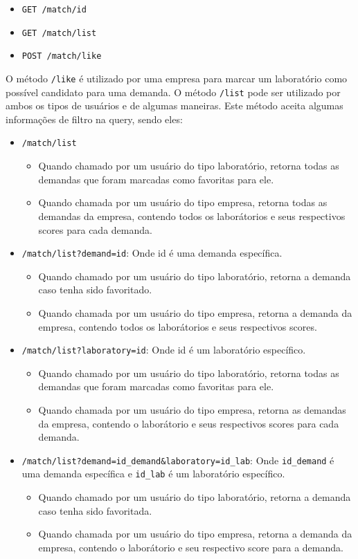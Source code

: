 \begin{itemize}
  \item \texttt{GET /match/{id}}
  \item \texttt{GET /match/list}
  \item \texttt{POST /match/like}
\end{itemize}

O método \texttt{/like} é utilizado por uma empresa para marcar um laboratório como possível candidato para uma demanda. O método \texttt{/list} pode ser utilizado por ambos os tipos de usuários e de algumas maneiras. Este método aceita algumas informações de filtro na query, sendo eles:

\begin{itemize}
  \item \texttt{/match/list}
        \begin{itemize}
          \item Quando chamado por um usuário do tipo laboratório, retorna todas as demandas que foram marcadas como favoritas para ele.
          \item Quando chamada por um usuário do tipo empresa, retorna todas as demandas da empresa, contendo todos os laborátorios e seus respectivos scores para cada demanda.
        \end{itemize}
  \item \texttt{/match/list?demand=id}: Onde id é uma demanda específica.
        \begin{itemize}
          \item Quando chamado por um usuário do tipo laboratório, retorna a demanda caso tenha sido favoritado.
          \item Quando chamada por um usuário do tipo empresa, retorna a demanda da empresa, contendo todos os laborátorios e seus respectivos scores.
        \end{itemize}
  \item \texttt{/match/list?laboratory=id}: Onde id é um laboratório específico.
        \begin{itemize}
          \item Quando chamado por um usuário do tipo laboratório, retorna todas as demandas que foram marcadas como favoritas para ele.
          \item Quando chamada por um usuário do tipo empresa, retorna as demandas da empresa, contendo o laborátorio e seus respectivos scores para cada demanda.
        \end{itemize}
  \item \texttt{/match/list?demand=id\_demand\&laboratory=id\_lab}: Onde \texttt{id\_demand} é uma demanda específica e \texttt{id\_lab} é um laboratório específico.
        \begin{itemize}
          \item Quando chamado por um usuário do tipo laboratório, retorna a demanda caso tenha sido favoritada.
          \item Quando chamada por um usuário do tipo empresa, retorna a demanda da empresa, contendo o laborátorio e seu respectivo score para a demanda.
        \end{itemize}
\end{itemize}

